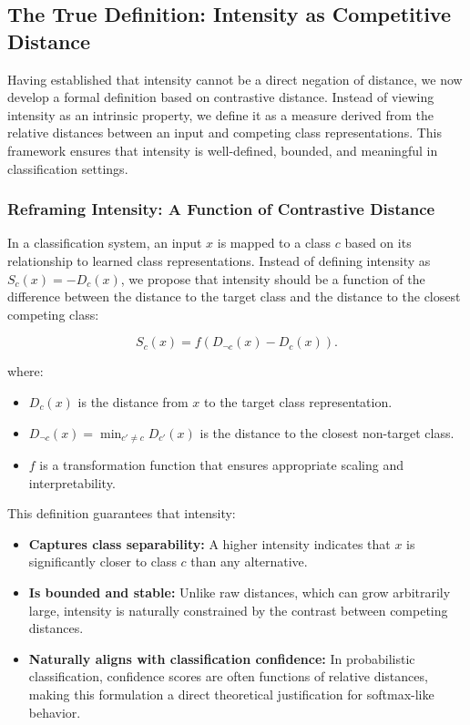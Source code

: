\subsection{The True Definition: Intensity as Competitive Distance}

Having established that intensity cannot be a direct negation of distance, we now develop a formal definition based on contrastive distance. Instead of viewing intensity as an intrinsic property, we define it as a measure derived from the relative distances between an input and competing class representations. This framework ensures that intensity is well-defined, bounded, and meaningful in classification settings.

\subsubsection{Reframing Intensity: A Function of Contrastive Distance}

In a classification system, an input \( x \) is mapped to a class \( c \) based on its relationship to learned class representations. Instead of defining intensity as \( S_c(x) = -D_c(x) \), we propose that intensity should be a function of the difference between the distance to the target class and the distance to the closest competing class:

\[
S_c(x) = f(D_{\neg c}(x) - D_c(x)).
\]

where:

\begin{itemize}
    \item \( D_c(x) \) is the distance from \( x \) to the target class representation.
    \item \( D_{\neg c}(x) = \min_{c' \neq c} D_{c'}(x) \) is the distance to the closest non-target class.
    \item \( f \) is a transformation function that ensures appropriate scaling and interpretability.
\end{itemize}

This definition guarantees that intensity:

\begin{itemize}
    \item \textbf{Captures class separability:} A higher intensity indicates that \( x \) is significantly closer to class \( c \) than any alternative.
    \item \textbf{Is bounded and stable:} Unlike raw distances, which can grow arbitrarily large, intensity is naturally constrained by the contrast between competing distances.
    \item \textbf{Naturally aligns with classification confidence:} In probabilistic classification, confidence scores are often functions of relative distances, making this formulation a direct theoretical justification for softmax-like behavior.
\end{itemize}

